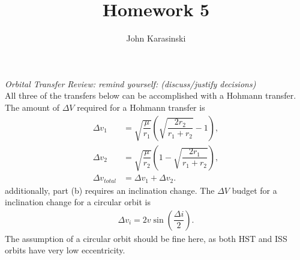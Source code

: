 \documentclass[onecolumn,10pt]{jhwhw}
\author{John Karasinski}
\title{Homework 5}
\begin{document}

\problem{}
\textit{Orbital Transfer Review: remind yourself: (discuss/justify decisions)} \\
All three of the transfers below can be accomplished with a Hohmann transfer. The amount of $\Delta V$ required for a Hohmann transfer is
\begin{align*}
\Delta v_1 &= \sqrt{\dfrac{\mu}{r_1}} \left(\sqrt{\dfrac{2r_2}{r_1 + r_2}} -1 \right), \\
\Delta v_2 &= \sqrt{\dfrac{\mu}{r_2}} \left(1 - \sqrt{\dfrac{2r_1}{r_1 + r_2}} \right), \\
\Delta v_{total} &= \Delta v_1 + \Delta v_2.
\end{align*}
additionally, part (b) requires an inclination change. The $\Delta V$ budget for a inclination change for a circular orbit is
\begin{align*}
\Delta{v_i}= 2 v \sin \left( \dfrac{\Delta i}{2} \right).
\end{align*}
The assumption of a circular orbit should be fine here, as both HST and ISS orbits have very low eccentricity.
\end{document}
